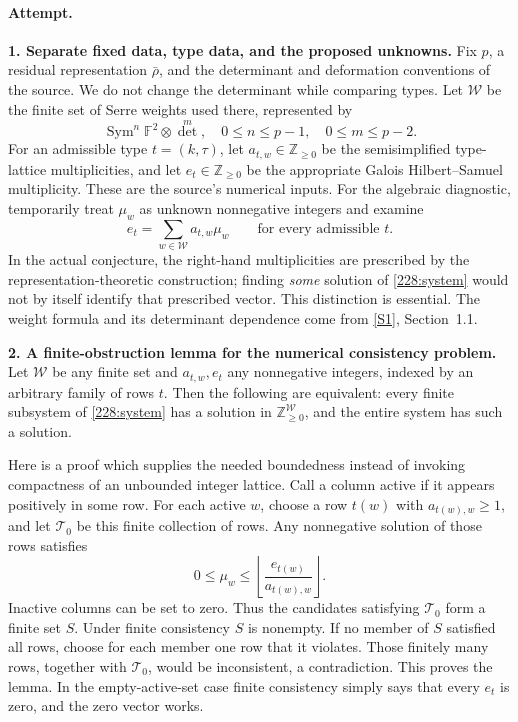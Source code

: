 \documentclass[11pt,a4paper]{article}
\newcommand{\Z}{\mathbb{Z}}
\newcommand{\F}{\mathbb{F}}
\newcommand{\sref}[2]{\hyperlink{source:#1:#2}{[S#2]}}
\numberwithin{equation}{section}
\begin{document}
\paragraph{Attempt.}
\textbf{1. Separate fixed data, type data, and the proposed unknowns.}
Fix $p$, a residual representation $\bar\rho$, and the determinant and
deformation conventions of the source. We do not change the determinant
while comparing types. Let $\mathcal W$ be the finite set of Serre
weights used there, represented by
\[
 \operatorname{Sym}^n\F^2\otimes\det^m,
       \quad 0\le n\le p-1,\quad0\le m\le p-2.
\]
For an admissible type $t=(k,\tau)$, let $a_{t,w}\in\Z_{\ge0}$ be the
semisimplified type-lattice multiplicities, and let $e_t\in\Z_{\ge0}$
be the appropriate Galois Hilbert--Samuel multiplicity. These are the
source's numerical inputs. For the algebraic diagnostic, temporarily
treat $\mu_w$ as unknown nonnegative integers and examine
\begin{equation}\label{228:system}
 e_t=\sum_{w\in\mathcal W}a_{t,w}\mu_w
                      \qquad\text{for every admissible }t.
\end{equation}
In the actual conjecture, the right-hand multiplicities are prescribed
by the representation-theoretic construction; finding \emph{some}
solution of \eqref{228:system} would not by itself identify that
prescribed vector. This distinction is essential. The weight formula
and its determinant dependence come from \sref{228}{1}, Section~1.1.

\textbf{2. A finite-obstruction lemma for the numerical consistency problem.}
Let $\mathcal W$ be any finite set and $a_{t,w},e_t$ any nonnegative
integers, indexed by an arbitrary family of rows $t$. Then the following
are equivalent: every finite subsystem of \eqref{228:system} has a
solution in $\Z_{\ge0}^{\mathcal W}$, and the entire system has such a
solution.

Here is a proof which supplies the needed boundedness instead of invoking
compactness of an unbounded integer lattice. Call a column active if it
appears positively in some row. For each active $w$, choose a row
$t(w)$ with $a_{t(w),w}\ge1$, and let $\mathcal T_0$ be this finite
collection of rows. Any nonnegative solution of those rows satisfies
\begin{equation}\label{228:box}
 0\le\mu_w\le
 \left\lfloor\frac{e_{t(w)}}{a_{t(w),w}}\right\rfloor.
\end{equation}
Inactive columns can be set to zero. Thus the candidates satisfying
$\mathcal T_0$ form a finite set $S$. Under finite consistency $S$ is
nonempty. If no member of $S$ satisfied all rows, choose for each member
one row that it violates. Those finitely many rows, together with
$\mathcal T_0$, would be inconsistent, a contradiction. This proves
the lemma. In the empty-active-set case finite consistency simply says
that every $e_t$ is zero, and the zero vector works.
\end{document}
